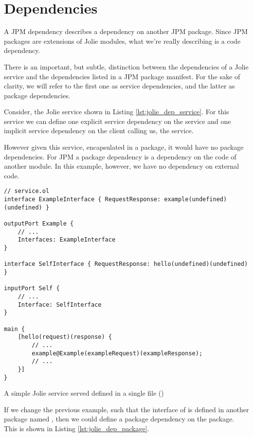 \section{Dependencies}

A JPM dependency describes a dependency on another JPM package. Since JPM
packages are extensions of Jolie modules, what we're really describing is a
code dependency.

There is an important, but subtle, distinction between the dependencies of a
Jolie service and the dependencies listed in a JPM package manifest. For the
sake of clarity, we will refer to the first one as service dependencies, and
the latter as package dependencies.

Consider, the Jolie service shown in Listing \ref{lst:jolie_dep_service}.  For
this service we can define one explicit service dependency on the
 service and one implicit service dependency on the client
calling us, the  service.

However given this service, encapsulated in a package, it would have no package
dependencies. For JPM a package dependency is a dependency on the code of
another module. In this example, however, we have no dependency on external
code.

\begin{listing}[H]
\begin{verbatim}
// service.ol
interface ExampleInterface { RequestResponse: example(undefined)(undefined) }

outputPort Example {
    // ...
    Interfaces: ExampleInterface
}

interface SelfInterface { RequestResponse: hello(undefined)(undefined) }

inputPort Self {
    // ...
    Interface: SelfInterface
}

main {
    [hello(request)(response) {
        // ...
        example@Example(exampleRequest)(exampleResponse);
        // ...
    }]
}
\end{verbatim}
\caption{A simple Jolie service served defined in a single file
    ()}
\label{lst:jolie_dep_service}
\end{listing}

If we change the previous example, such that the interface of  is
defined in another package named , then we could define a
package dependency on the  package. This is shown in Listing
\ref{lst:jolie_dep_package}.

